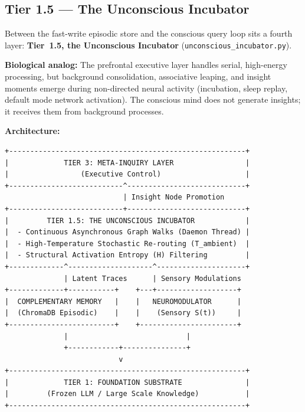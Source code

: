 \documentclass[11pt,a4paper]{article}
\begin{document}
\subsection{Tier 1.5 — The Unconscious Incubator}
\label{sec:incubator}

Between the fast-write episodic store and the conscious query loop sits a fourth layer:
\textbf{Tier~1.5, the Unconscious Incubator} (\texttt{unconscious\_incubator.py}).

\textbf{Biological analog:} The prefrontal executive layer handles serial, high-energy
processing, but background consolidation, associative leaping, and insight moments emerge
during non-directed neural activity (incubation, sleep replay, default mode network
activation). The conscious mind does not generate insights; it receives them from
background processes.

\textbf{Architecture:}
\begin{lstlisting}[language={},frame=single]
+--------------------------------------------------------+
|             TIER 3: META-INQUIRY LAYER                 |
|                 (Executive Control)                    |
+---------------------------^----------------------------+
                            | Insight Node Promotion
+---------------------------+----------------------------+
|         TIER 1.5: THE UNCONSCIOUS INCUBATOR            |
|  - Continuous Asynchronous Graph Walks (Daemon Thread) |
|  - High-Temperature Stochastic Re-routing (T_ambient)  |
|  - Structural Activation Entropy (H) Filtering         |
+-------------^--------------------^---------------------+
              | Latent Traces      | Sensory Modulations
+-------------+-----------+    +---+-------------------+
|  COMPLEMENTARY MEMORY   |    |   NEUROMODULATOR      |
|  (ChromaDB Episodic)    |    |    (Sensory S(t))     |
+-------------------------+    +-----------------------+
              |                            |
              +------------+---------------+
                           v
+--------------------------------------------------------+
|             TIER 1: FOUNDATION SUBSTRATE               |
|         (Frozen LLM / Large Scale Knowledge)           |
+--------------------------------------------------------+
\end{lstlisting}
\end{document}
